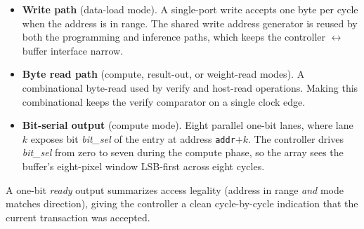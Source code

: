 \begin{itemize}
    \item \textbf{Write path} (data-load mode). A single-port write
          accepts one byte per cycle when the address is in range. The
          shared write address generator is reused by both the
          programming and inference paths, which keeps the controller
          $\leftrightarrow$ buffer interface narrow.
    \item \textbf{Byte read path} (compute, result-out, or weight-read
          modes). A combinational byte-read used by verify and host-read
          operations. Making this combinational keeps the verify
          comparator on a single clock edge.
    \item \textbf{Bit-serial output} (compute mode). Eight parallel
          one-bit lanes, where lane $k$ exposes bit \emph{bit\_sel} of
          the entry at address \texttt{addr}$+k$. The controller drives
          \emph{bit\_sel} from zero to seven during the compute phase,
          so the array sees the buffer's eight-pixel window LSB-first
          across eight cycles.
\end{itemize}

A one-bit \emph{ready} output summarizes access legality (address in
range \emph{and} mode matches direction), giving the controller a clean
cycle-by-cycle indication that the current transaction was accepted.
